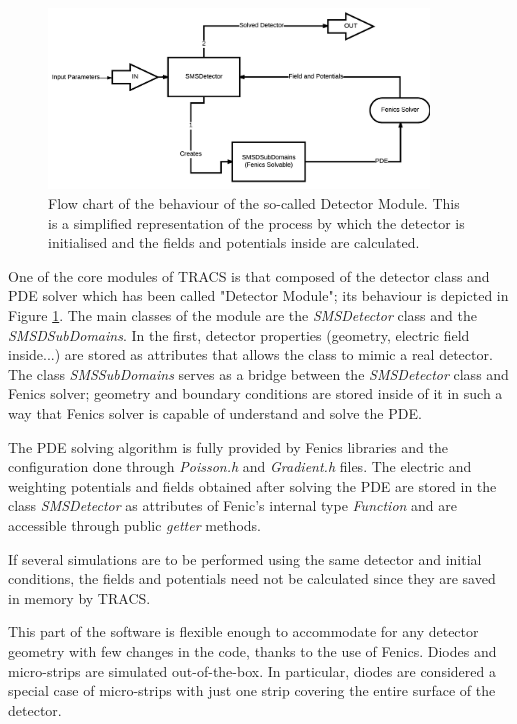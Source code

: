 \begin{figure}[H]
	\includegraphics[width=0.9\textwidth]{Detector_Module.png}
	\caption{Flow chart of the behaviour of the so-called Detector Module. This is a simplified representation of the process by which the detector is initialised and the fields and potentials inside are calculated.}
	\label{fig:DetectorFc}
\end{figure}

One of the core modules of TRACS is that composed of the detector class and PDE solver which has been called "Detector Module"; its behaviour is depicted in Figure \ref{fig:DetectorFc}. The main classes of the module are the \textit{SMSDetector} class and the \textit{SMSDSubDomains}. In the first, detector properties (geometry, electric field inside...) are stored as attributes that allows the class to mimic a real detector. The class \textit{SMSSubDomains} serves as a bridge between the \textit{SMSDetector} class and Fenics solver; geometry and boundary conditions are stored inside of it in such a way that Fenics solver is capable of understand and solve the PDE. 

The PDE solving algorithm is fully provided by Fenics libraries and the configuration done through \textit{Poisson.h} and \textit{Gradient.h} files. The electric and weighting potentials and fields obtained after solving the PDE are stored in the class \textit{SMSDetector} as attributes of Fenic's internal type \textit{Function} and are accessible through public \textit{getter} methods.

If several simulations are to be performed using the same detector and initial conditions, the fields and potentials need not be calculated since they are saved in memory by TRACS. 

This part of the software is flexible enough to accommodate for any detector geometry with few changes in the code, thanks to the use of Fenics. Diodes and micro-strips are simulated out-of-the-box. In particular, diodes are considered a special case of micro-strips with just one strip covering the entire surface of the detector.


